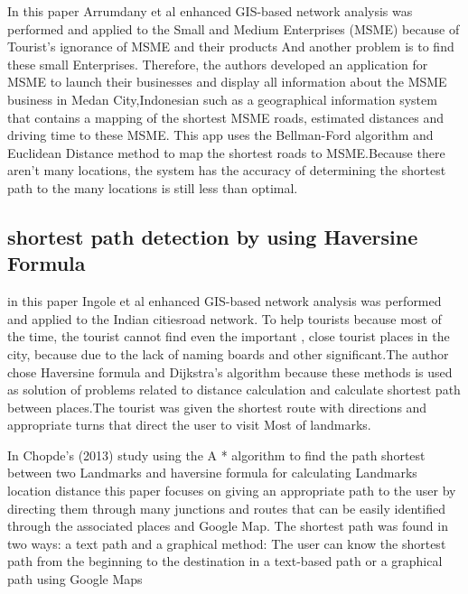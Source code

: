 \documentclass{article}
\begin{document}
In this paper\cite{arrumdany2019web} Arrumdany et al enhanced GIS-based network analysis was
performed and applied to the Small and Medium Enterprises (MSME) because of Tourist's ignorance of MSME and their products And another problem is to find these small Enterprises.
Therefore, the authors developed an application  for MSME to launch their businesses and display all information about the MSME business in Medan City,Indonesian such as a geographical
 information system that contains a mapping of the shortest MSME roads, estimated distances and driving time to these MSME. This app uses the Bellman-Ford algorithm and Euclidean
Distance method to map the shortest roads to MSME.Because there aren't many locations, the system has the accuracy of determining the shortest path to the many locations is still less than optimal.













\subsection{shortest path detection by using Haversine Formula}


in this paper\cite{ingole2013landmark} Ingole et al enhanced GIS-based network analysis was performed and applied to the Indian citiesroad network. To help tourists because most of the time, the tourist cannot find even the important , close tourist places in the city, because  due to the lack of naming boards and other significant.The author chose Haversine formula and Dijkstra’s algorithm because  these methods is used as solution of problems related to distance calculation and calculate  shortest path between places.The tourist was given the shortest route with directions and appropriate turns that direct the user to visit  Most of  landmarks.


In Chopde's (2013) study\cite{chopde2013landmark} using the A * algorithm to find the path shortest between two Landmarks and haversine formula for calculating  Landmarks location distance 
 this paper focuses on giving an appropriate path to the user by directing them through many junctions and routes that can be easily identified through the associated places and Google Map.
The shortest path was found in two ways: a text path and a graphical method:
The user can know the shortest path from the beginning to the destination in a text-based path or a graphical path using Google Maps
\end{document}
